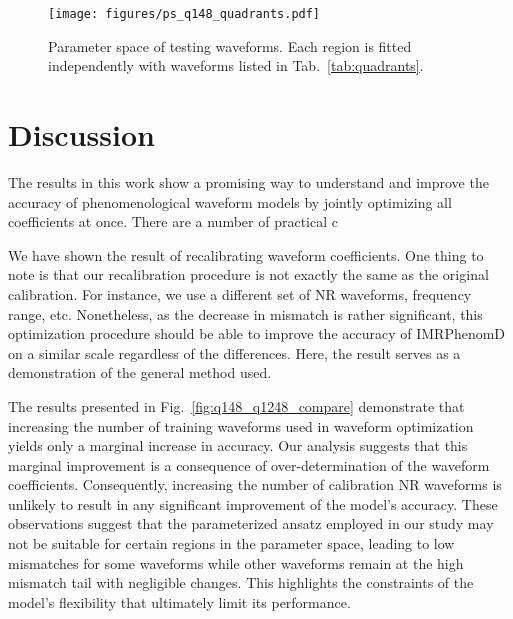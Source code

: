 \documentclass[twocolumn]{aastex631}
\begin{document}
\begin{figure}[t]
	\centering
	\texttt{[image: figures/ps\_q148\_quadrants.pdf]}
	\caption{Parameter space of testing waveforms. Each region is fitted independently with waveforms listed in Tab.~\ref{tab:quadrants}.}
	\label{fig:ps_q148_quadrant}
\end{figure}

\section{Discussion} \label{sec:discussion}

The results in this work show a promising way to understand and improve the
accuracy of phenomenological waveform models by jointly optimizing all
coefficients at once. There are a number of practical c


We have shown the result of recalibrating waveform coefficients. One thing to
note is that our recalibration procedure is not exactly the same as the original
calibration. For instance, we use a different set of NR waveforms, frequency
range, etc. Nonetheless, as the decrease in mismatch is rather significant, this
optimization procedure should be able to improve the accuracy of IMRPhenomD on a
similar scale regardless of the differences. Here, the result serves as a
demonstration of the general method used.  

The results presented in Fig.~\ref{fig:q148_q1248_compare} demonstrate that
increasing the number of training waveforms used in waveform optimization yields
only a marginal increase in accuracy. Our analysis suggests that this marginal
improvement is a consequence of over-determination of the waveform coefficients.
Consequently, increasing the number of calibration NR waveforms is unlikely to
result in any significant improvement of the model's accuracy. These
observations suggest that the parameterized ansatz employed in our study may not
be suitable for certain regions in the parameter space, leading to low mismatches
for some waveforms while other waveforms remain at the high mismatch tail with
negligible changes. This highlights the constraints of the model's flexibility
that ultimately limit its performance.
\end{document}
